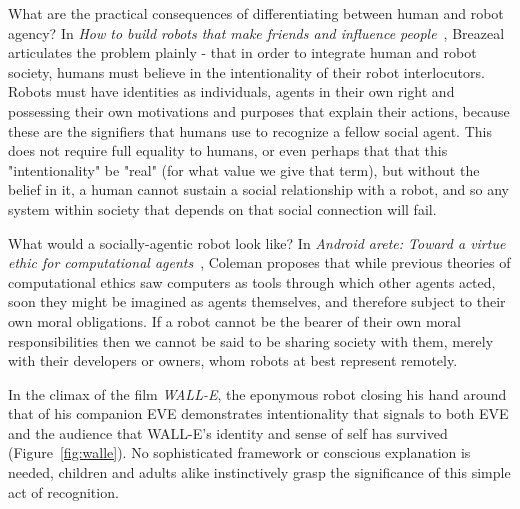 \documentclass{sfuthesis}
\begin{document}
What are the practical consequences of differentiating between human and robot agency? In \textit{How to build robots that make friends and influence people}~\cite{breazeal1999build}, Breazeal articulates the problem plainly - that in order to integrate human and robot society, humans must believe in the intentionality of their robot interlocutors. Robots must have identities as individuals, agents in their own right and possessing their own motivations and purposes that explain their actions, because these are the signifiers that humans use to recognize a fellow social agent. This does not require full equality to humans, or even perhaps that that this "intentionality" be "real" (for what value we give that term), but without the belief in it, a human cannot sustain a social relationship with a robot, and so any system within society that depends on that social connection will fail.


What would a socially-agentic robot look like? In \textit{Android arete: Toward a virtue ethic for computational agents}~\cite{coleman2001android}, Coleman proposes that while previous theories of computational ethics saw computers as tools through which other agents acted, soon they might be imagined as agents themselves, and therefore subject to their own moral obligations. If a robot cannot be the bearer of their own moral responsibilities then we cannot be said to be sharing society with them, merely with their developers or owners, whom robots at best represent remotely.

In the climax of the film \textit{WALL-E}, the eponymous robot closing his hand around that of his companion EVE demonstrates intentionality that signals to both EVE and the audience that WALL-E's identity and sense of self has survived (Figure~\ref{fig:walle}). No sophisticated framework or conscious explanation is needed, children and adults alike instinctively grasp the significance of this simple act of recognition.
\end{document}
